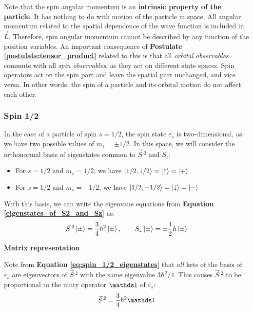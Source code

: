Note that the spin angular momentum is an \textbf{intrinsic property of the particle}. It has nothing to do with motion of the particle in space. All angular momentum related to the spatial dependence of the wave function is included in $\vec{L}$. Therefore, spin angular momentum cannot be described by any function of the position variables. An important consequence of \textbf{Postulate \ref{postulate:tensor_product}} related to this is that all \textit{orbital observables} commute with all \textit{spin observables}, as they act on different state spaces. Spin operators act on the spin part and leave the spatial part unchanged, and vice versa. In other words, the spin of a particle and its orbital motion do not affect each other. 

\subsubsection{Spin 1/2}

In the case of a particle of spin $s=1/2$, the spin state $\varepsilon_s$ is two-dimensional, as we have two possible values of $m_s = \pm 1/2$. In this space, we will consider the orthonormal basis of eigenstates common to $\vec{S}\,^2$ and $S_z$:
\begin{itemize}
    \item For $s=1/2$ and $m_s=1/2$, we have $\ket{1/2, 1/2} = \ket{\uparrow}=\ket{+}$
    \item For $s=1/2$ and $m_s=-1/2$, we have $\ket{1/2, -1/2} = \ket{\downarrow}=\ket{-}$
\end{itemize}

With this basis, we can write the eigenvaue equations from \textbf{Equation \ref{eigenstates_of_S2_and_Sz}} as:
\begin{equation} \label{eq:spin_1/2_eigenstates}
    \vec{S}\,^2\ket{\pm} =\frac{3}{4}\hbar^2\ket{\pm}, \qquad S_z\ket{\pm} = \pm\frac{1}{2}\hbar\ket{\pm}
\end{equation}

\textbf{Matrix representation}

Note from \textbf{Equation \ref{eq:spin_1/2_eigenstates}} that \textit{all} kets of the basis of $\varepsilon_s$ are eigenvectors of $\vec{S}\,^2$ with the same eigenvalue $3\hbar^2/4$. This causes $\vec{S}\,^2$ to be proportional to the unity operator $\Imat$ of $\varepsilon_s$:
\begin{equation}
    \vec{S}\,^2 = \frac{3}{4}\hbar^2\Imat
\end{equation}

